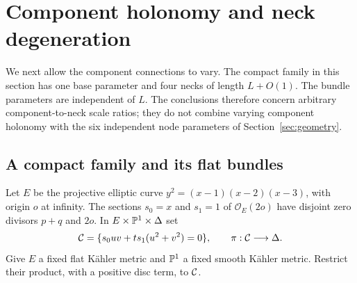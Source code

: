 \section{Component holonomy and neck degeneration}\label{sec:component-holonomy}

We next allow the component connections to vary.
The compact family in this section has one base
parameter and four necks of length $L+O(1)$.
The bundle parameters are independent of $L$.
The conclusions therefore concern arbitrary
component-to-neck scale ratios; they do not
combine varying component holonomy with the
six independent node parameters of
Section~\ref{sec:geometry}.

\subsection{A compact family and its flat bundles}
Let $E$ be the projective elliptic curve
$y^2=(x-1)(x-2)(x-3)$, with origin $o$ at infinity.
The sections $s_0=x$ and $s_1=1$ of
$\mathcal O_E(2o)$ have disjoint zero divisors
$p+q$ and $2o$. In $E\times\mathbb P^1\times\Delta$ set
\begin{equation}\label{eq:elliptic-family}
 \mathcal C=\{s_0uv+t s_1(u^2+v^2)=0\},
 \qquad \pi:\mathcal C\longrightarrow\Delta .
\end{equation}
Give $E$ a fixed flat Kähler metric and $\mathbb P^1$
a fixed smooth Kähler metric. Restrict their
product, with a positive disc term, to $\mathcal C$.

